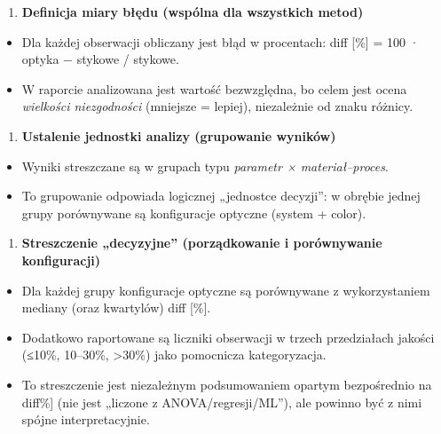 \documentclass[
  10pt,
]{article}
\providecommand{\tightlist}{%
  \setlength{\itemsep}{0pt}\setlength{\parskip}{0pt}}
\begin{document}
\begin{enumerate}
\def\labelenumi{\arabic{enumi}.}
\setcounter{enumi}{1}
\tightlist
\item
  \textbf{Definicja miary błędu (wspólna dla wszystkich metod)}
\end{enumerate}

\begin{itemize}
\tightlist
\item
  Dla każdej obserwacji obliczany jest błąd w procentach:
  \textbar diff\textbar{} {[}\%{]} = 100 · \textbar optyka −
  stykowe\textbar{} / stykowe.
\item
  W raporcie analizowana jest wartość bezwzględna, bo celem jest ocena
  \emph{wielkości niezgodności} (mniejsze = lepiej), niezależnie od
  znaku różnicy.
\end{itemize}

\begin{enumerate}
\def\labelenumi{\arabic{enumi}.}
\setcounter{enumi}{2}
\tightlist
\item
  \textbf{Ustalenie jednostki analizy (grupowanie wyników)}
\end{enumerate}

\begin{itemize}
\tightlist
\item
  Wyniki streszczane są w grupach typu \emph{parametr ×
  materiał--proces}.
\item
  To grupowanie odpowiada logicznej „jednostce decyzji'': w obrębie
  jednej grupy porównywane są konfiguracje optyczne (system + color).
\end{itemize}

\begin{enumerate}
\def\labelenumi{\arabic{enumi}.}
\setcounter{enumi}{3}
\tightlist
\item
  \textbf{Streszczenie „decyzyjne'' (porządkowanie i porównywanie
  konfiguracji)}
\end{enumerate}

\begin{itemize}
\tightlist
\item
  Dla każdej grupy konfiguracje optyczne są porównywane z
  wykorzystaniem mediany (oraz kwartylów) \textbar diff\textbar{}
  {[}\%{]}.
\item
  Dodatkowo raportowane są liczniki obserwacji w trzech przedziałach
  jakości (≤10\%, 10--30\%, \textgreater30\%) jako pomocnicza
  kategoryzacja.
\item
  To streszczenie jest niezależnym podsumowaniem opartym bezpośrednio na
  \textbar diff\textbar{[}\%{]} (nie jest „liczone z
  ANOVA/regresji/ML''), ale powinno być z nimi spójne interpretacyjnie.
\end{itemize}
\end{document}
